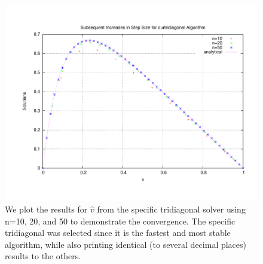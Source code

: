 \documentclass[11pt,a4paper]{article}
\begin{document}
\begin{figure}
\centering
\includegraphics[width=1.0\textwidth]{comparisonourtri.pdf}
\caption{We plot the results for $\hat{v}$ from the specific tridiagonal solver using n=10, 20, and 50 to demonstrate the convergence. The specific tridiagonal was selected since it is the fastest and most stable algorithm, while also printing identical (to several decimal places) results to the others.}
\end{figure}
\end{document}
